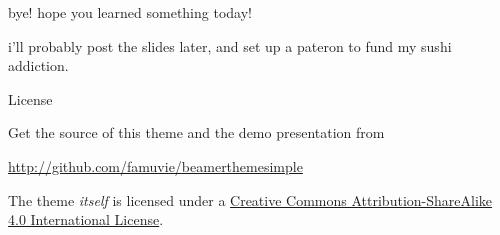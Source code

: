 \documentclass{beamer}
\begin{document}
\begin{frame}{bye!}
hope you learned something today!

i'll probably post the slides later, and set up a pateron to fund my sushi addiction.
\end{frame}


\begin{frame}{License}

  \begin{block}{Get the source of this theme and the demo presentation from}

  \begin{center}\url{http://github.com/famuvie/beamerthemesimple}\end{center}

  \end{block}
  
  The theme \emph{itself} is licensed under a
  \href{http://creativecommons.org/licenses/by-sa/4.0/}{Creative Commons
  Attribution-ShareAlike 4.0 International License}.

  \begin{center}\ccbysa\end{center}

\end{frame}
\end{document}

